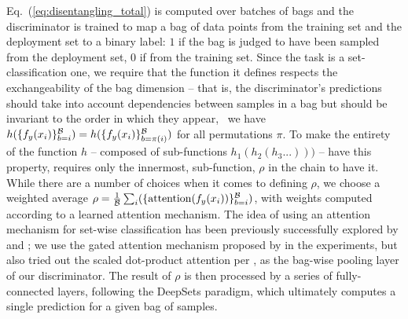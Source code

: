 Eq.~(\ref{eq:disentangling_total}) is computed over batches of bags and the discriminator is trained to map a bag of data points from the training set and the deployment set to a binary label:
$1$ if the bag is judged to have been sampled from the deployment set, $0$ if from the training set.
Since the task is a set-classification one, we require that the function it defines respects the exchangeability of the bag dimension -- that is, the discriminator's predictions should take into account dependencies between samples in a bag but should be invariant to the order in which they appear,
\ie\ we have
\(h(\{f_y(x_i)\}^{\mathcal{B}}_{b=i}) = h(\{f_y(x_i)\}^{\mathcal{B}}_{b=\pi (i)})\)
for all permutations $\pi$.
To make the entirety of the function $h$ -- composed of sub-functions $h_1(h_2(h_3...)))$ -- have this property, requires only the innermost, sub-function, $\rho$ in the chain to have it.
While there are a number of choices when it comes to defining $\rho$, we choose a weighted average $\rho = \frac{1}{{\mathcal{B}}} \sum_i(\{\mathrm{attention}(f_y(x_i))\}^{\mathcal{B}}_{b=i})$, with weights computed according to a learned attention mechanism. The idea of using an attention mechanism for set-wise classification has been previously successfully explored by \citet{ilse2018attention} and  \citet{lee2019set};
we use the gated attention mechanism proposed by \citet{ilse2018attention} in the experiments, but also tried out the scaled dot-product attention per \citet{vaswani2017attention}, as the bag-wise pooling layer of our discriminator.
The result of $\rho$ is then processed by a series of fully-connected layers, following the DeepSets  \citep{zaheer2017deep} paradigm, which ultimately computes a single prediction for a given bag of samples.

